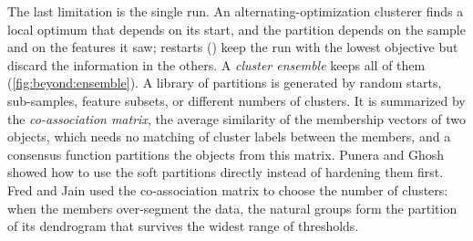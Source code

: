 The last limitation is the single run. An alternating-optimization clusterer finds a local optimum that depends on its start, and the partition depends on the sample and on the features it saw; restarts () keep the run with the lowest objective but discard the information in the others. A \emph{cluster ensemble} \cite{strehl:2002:ensembles} keeps all of them (\cref{fig:beyond:ensemble}). A library of partitions is generated by random starts, sub-samples, feature subsets, or different numbers of clusters. It is summarized by the \emph{co-association matrix}, the average similarity of the membership vectors of two objects, which needs no matching of cluster labels between the members, and a consensus function partitions the objects from this matrix. Punera and Ghosh \cite{punera:2008:soft} showed how to use the soft partitions directly instead of hardening them first. Fred and Jain \cite{fred:2005:eac} used the co-association matrix to choose the number of clusters: when the members over-segment the data, the natural groups form the partition of its dendrogram that survives the widest range of thresholds.

